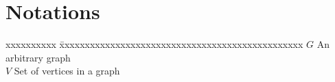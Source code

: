 \chapter*{Notations}
\begin{tabbing}
xxxxxxxxxx \= xxxxxxxxxxxxxxxxxxxxxxxxxxxxxxxxxxxxxxxxxxxxxxxx \kill
$G$ \> An arbitrary graph\\
$V$ \> Set of vertices in a graph\\
\end{tabbing}
